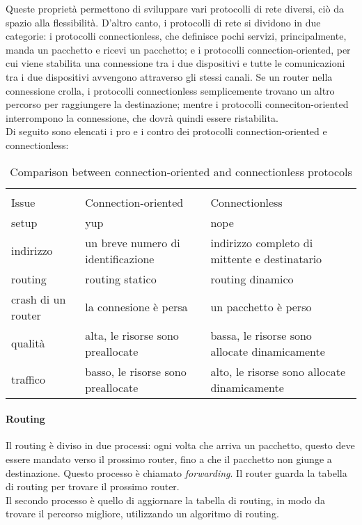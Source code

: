 \documentclass{article}
\begin{document}
Queste proprietà permettono di sviluppare vari protocolli di rete diversi, ciò
da spazio alla flessibilità. D'altro canto, i protocolli di rete si dividono in
due categorie: i protocolli connectionless, che definisce pochi servizi,
principalmente, manda un pacchetto e ricevi un pacchetto; e i protocolli
connection-oriented, per cui viene stabilita una connessione tra i due
dispositivi e tutte le comunicazioni tra i due dispositivi avvengono attraverso
gli stessi canali. Se un router nella connessione crolla, i protocolli
connectionless semplicemente trovano un altro percorso per raggiungere la
destinazione; mentre i protocolli conneciton-oriented interrompono la
connessione, che dovrà quindi essere ristabilita.\\
Di seguito sono elencati i pro e i contro dei protocolli connection-oriented e
connectionless:
\begin{table}[h]
	\label{tab:cmp_conn}
	\centering
	\begin{tabular}{|l|l|l|}
		\hline
		& & \\
		Issue & Connection-oriented & Connectionless \\
		\hline
		setup & yup & nope \\
		indirizzo & un breve numero di identificazione & indirizzo completo
		di mittente e destinatario \\
		routing & routing statico & routing dinamico \\
		crash di un router & la connesione è persa & un pacchetto è perso \\
		qualità & alta, le risorse sono preallocate & bassa, le risorse sono
		allocate dinamicamente \\
		traffico & basso, le risorse sono preallocate & alto, le
		risorse sono allocate dinamicamente \\
		\hline
	\end{tabular}
	\caption{Comparison between connection-oriented and connectionless
		protocols}
\end{table}

\paragraph{Routing}
Il routing è diviso in due processi: ogni volta che arriva un pacchetto, questo
deve essere mandato verso il prossimo router, fino a che il pacchetto non giunge
a destinazione. Questo processo è chiamato \textit{forwarding}. Il router guarda
la tabella di routing per trovare il prossimo router.\\
Il secondo processo è quello di aggiornare la tabella di routing, in modo da
trovare il percorso migliore, utilizzando un algoritmo di routing.\\
\end{document}

